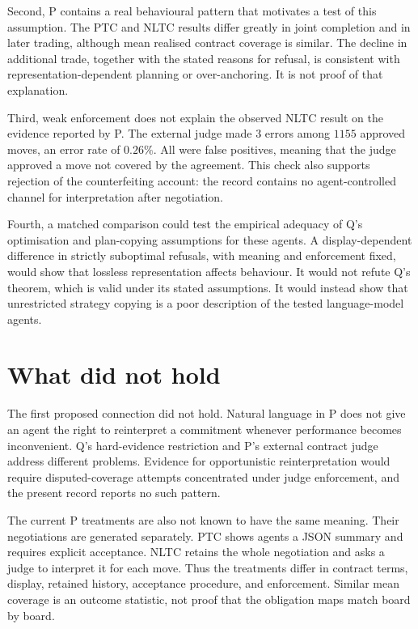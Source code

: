 \documentclass{article}
\begin{document}
Second, P contains a real behavioural pattern that motivates a test of this assumption.  The PTC and NLTC results differ greatly in joint completion and in later trading, although mean realised contract coverage is similar.  The decline in additional trade, together with the stated reasons for refusal, is consistent with representation-dependent planning or over-anchoring.  It is not proof of that explanation.

Third, weak enforcement does not explain the observed NLTC result on the evidence reported by P.  The external judge made \(3\) errors among \(1155\) approved moves, an error rate of \(0.26\%\).  All were false positives, meaning that the judge approved a move not covered by the agreement.  This check also supports rejection of the counterfeiting account: the record contains no agent-controlled channel for interpretation after negotiation.

Fourth, a matched comparison could test the empirical adequacy of Q's optimisation and plan-copying assumptions for these agents.  A display-dependent difference in strictly suboptimal refusals, with meaning and enforcement fixed, would show that lossless representation affects behaviour.  It would not refute Q's theorem, which is valid under its stated assumptions.  It would instead show that unrestricted strategy copying is a poor description of the tested language-model agents.

\section{What did not hold}

The first proposed connection did not hold.  Natural language in P does not give an agent the right to reinterpret a commitment whenever performance becomes inconvenient.  Q's hard-evidence restriction and P's external contract judge address different problems.  Evidence for opportunistic reinterpretation would require disputed-coverage attempts concentrated under judge enforcement, and the present record reports no such pattern.

The current P treatments are also not known to have the same meaning.  Their negotiations are generated separately.  PTC shows agents a JSON summary and requires explicit acceptance.  NLTC retains the whole negotiation and asks a judge to interpret it for each move.  Thus the treatments differ in contract terms, display, retained history, acceptance procedure, and enforcement.  Similar mean coverage is an outcome statistic, not proof that the obligation maps match board by board.
\end{document}
